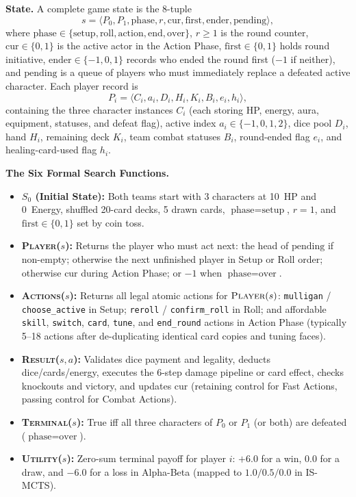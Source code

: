 \documentclass[11pt,a4paper]{article}
\newcommand{\fn}[1]{\textsc{#1}}
\begin{document}
\textbf{State.} A complete game state is the 8-tuple
\begin{equation}
  s = \langle P_0, P_1, \text{phase}, r, \text{cur}, \text{first}, \text{ender}, \text{pending} \rangle,
\end{equation}
where $\text{phase} \in \{\text{setup}, \text{roll}, \text{action}, \text{end}, \text{over}\}$, $r \ge 1$ is the round counter, $\text{cur} \in \{0,1\}$ is the active actor in the Action Phase, $\text{first} \in \{0,1\}$ holds round initiative, $\text{ender} \in \{-1,0,1\}$ records who ended the round first ($-1$ if neither), and $\text{pending}$ is a queue of players who must immediately replace a defeated active character. Each player record is
\begin{equation}
  P_i = \langle C_i, a_i, D_i, H_i, K_i, B_i, e_i, h_i \rangle,
\end{equation}
containing the three character instances $C_i$ (each storing HP, energy, aura, equipment, statuses, and defeat flag), active index $a_i \in \{-1,0,1,2\}$, dice pool $D_i$, hand $H_i$, remaining deck $K_i$, team combat statuses $B_i$, round-ended flag $e_i$, and healing-card-used flag $h_i$.

\textbf{The Six Formal Search Functions.}
\begin{itemize}[leftmargin=1.4em, itemsep=2pt]
  \item \textbf{$S_0$ (Initial State):} Both teams start with 3 characters at 10~HP and 0~Energy, shuffled 20-card decks, 5 drawn cards, $\text{phase} = \text{setup}$, $r = 1$, and $\text{first} \in \{0,1\}$ set by coin toss.
  \item \textbf{\fn{Player}($s$):} Returns the player who must act next: the head of $\text{pending}$ if non-empty; otherwise the next unfinished player in Setup or Roll order; otherwise $\text{cur}$ during Action Phase; or $-1$ when $\text{phase} = \text{over}$.
  \item \textbf{\fn{Actions}($s$):} Returns all legal atomic actions for $\fn{Player}(s)$: \texttt{mulligan} / \texttt{choose\_active} in Setup; \texttt{reroll} / \texttt{confirm\_roll} in Roll; and affordable \texttt{skill}, \texttt{switch}, \texttt{card}, \texttt{tune}, and \texttt{end\_round} actions in Action Phase (typically 5--18 actions after de-duplicating identical card copies and tuning faces).
  \item \textbf{\fn{Result}($s, a$):} Validates dice payment and legality, deducts dice/cards/energy, executes the 6-step damage pipeline or card effect, checks knockouts and victory, and updates $\text{cur}$ (retaining control for Fast Actions, passing control for Combat Actions).
  \item \textbf{\fn{Terminal}($s$):} True iff all three characters of $P_0$ or $P_1$ (or both) are defeated ($\text{phase} = \text{over}$).
  \item \textbf{\fn{Utility}($s$):} Zero-sum terminal payoff for player $i$: $+6.0$ for a win, $0.0$ for a draw, and $-6.0$ for a loss in Alpha-Beta (mapped to $1.0 / 0.5 / 0.0$ in IS-MCTS).
\end{itemize}
\end{document}

